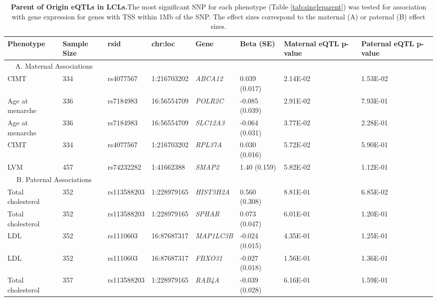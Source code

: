 \begin{table}
\centering
\begin{adjustbox}{width={\textwidth}}
\begin{tabular}{@{}p{3cm}|p{2cm}p{2cm}p{2cm}p{2.5cm}p{2cm}p{2cm}p{2cm}@{}}
\toprule Phenotype & Sample Size & rsid & chr:loc & Gene & Beta (SE) & Maternal eQTL p-value & Paternal eQTL p-value  \\ \midrule
 \multicolumn{2}{c}{A. Maternal Associations} &&&&&& \\ \hline

CIMT & 334 & rs4077567 & 1:216703202 & \emph{ABCA12} & 0.039 (0.017) & 2.14E-02 & 1.53E-02 \\ \hline
Age at menarche & 336 & rs7184983 & 16:56554709 & \emph{POLR2C} & -0.085 (0.039) & 2.91E-02 & 7.93E-01 \\ \hline
Age at menarche & 336 & rs7184983 & 16:56554709 & \emph{SLC12A3} & -0.064 (0.031) & 3.77E-02 & 	2.28E-01 \\ \hline
CIMT & 334 & rs4077567 & 1:216703202 & \emph{RPL37A} & 0.030 (0.016) & 5.72E-02 & 5.90E-01 \\ \hline
LVM & 457 & rs74232282 & 1:41662388 & \emph{SMAP2} & 1.40 (0.159) & 5.82E-02	& 1.12E-01 \\ \hline
 \multicolumn{2}{c}{B. Paternal Associations} &&&&&&  \\ \hline
Total cholesterol & 352 & rs113588203 & 1:228979165 & \emph{HIST3H2A} & 	0.560 (0.308) & 	8.81E-01 & 	6.85E-02 \\ \hline
Total cholesterol & 352 & rs113588203 & 1:228979165 & \emph{SPHAR} & 	0.073 (0.047) & 	6.01E-01 & 	1.20E-01 \\ \hline
LDL & 352 & rs1110603 & 16:87687317 & \emph{MAP1LC3B} & -0.024 (0.015) & 	4.35E-01 & 	1.25E-01 \\ \hline
LDL & 352 & rs1110603 & 16:87687317 & \emph{FBXO31} & -0.027 (0.018)	 & 1.56E-01 & 	1.36E-01 \\ \hline
Total cholesterol & 357 & rs113588203 & 1:228979165 & \emph{RAB4A} & 	-0.039 (0.028) & 	6.16E-01 & 	1.59E-01\\ \bottomrule
\end{tabular}
\end{adjustbox}
\caption[Parent of Origin eQTLs in LCLs. ]{\textbf{Parent of Origin eQTLs in LCLs.}The most significant SNP for each phenotype (Table \ref{tab:singleparent}) was tested for association with gene expression for genes with TSS within 1Mb of the SNP. The effect sizes correspond to the maternal (A) or paternal (B) effect sizes.}
\label{tab:pogexp}
\end{table}



